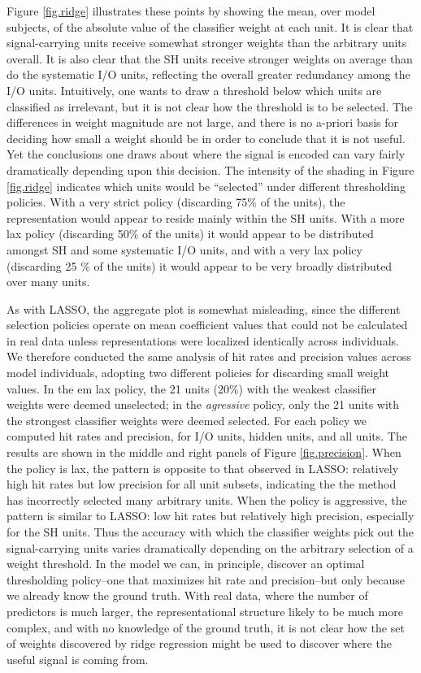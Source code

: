 Figure \ref{fig.ridge} illustrates these points by showing the mean, over model subjects, of the absolute value of the classifier weight at each unit. It is clear that signal-carrying units receive somewhat stronger weights than the arbitrary units overall. It is also clear that the SH units receive stronger weights on average than do the systematic I/O units, reflecting the overall greater redundancy among the I/O units. Intuitively, one wants to draw a threshold below which units are classified as irrelevant, but it is not clear how the threshold is to be selected. The differences in weight magnitude are not large, and there is no a-priori basis for deciding how small a weight should be in order to conclude that it is not useful. Yet the conclusions one draws about where the signal is encoded can vary fairly dramatically depending upon this decision. The intensity of the shading in Figure \ref{fig.ridge} indicates which units would be ``selected'' under different thresholding policies. With a very strict policy (discarding 75\% of the units), the representation would appear to reside mainly within the SH units. With a more lax policy (discarding 50\% of the units) it would appear to be distributed amongst SH and some systematic I/O units, and with a very lax policy (discarding 25 \% of the units) it would appear to be very broadly distributed over many units.

As with LASSO, the aggregate plot is somewhat misleading, since the different selection policies operate on mean coefficient values that could not be calculated in real data unless representations were localized identically across individuals. We therefore conducted the same analysis of hit rates and precision values across model individuals, adopting two different policies for discarding small weight values. In the {em lax} policy, the 21 units (20\%) with the weakest classifier weights were deemed unselected; in the {\em agressive} policy, only the 21 units with the strongest classifier weights were deemed selected. For each policy we computed hit rates and precision, for I/O units, hidden units, and all units. The results are shown in the middle and right panels of Figure \ref{fig.precision}. When the policy is lax, the pattern is opposite to that observed in LASSO: relatively high hit rates but low precision for all unit subsets, indicating the the method has incorrectly selected many arbitrary units. When the policy is aggressive, the pattern is similar to LASSO: low hit rates but relatively high precision, especially for the SH units. Thus the accuracy with which the classifier weights pick out the signal-carrying units varies dramatically depending on the arbitrary selection of a weight threshold. In the model we can, in principle, discover an optimal thresholding policy--one that maximizes hit rate and precision--but only because we already know the ground truth. With real data, where the number of predictors is much larger, the representational structure likely to be much more complex, and with no knowledge of the ground truth, it is not clear how the set of weights discovered by ridge regression might be used to discover where the useful signal is coming from.  

